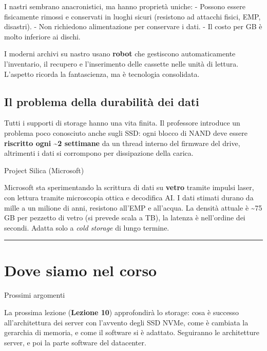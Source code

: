 \documentclass[
  italian,
  openany]{book}
\begin{document}
I nastri sembrano anacronistici, ma hanno proprietà uniche: - Possono
essere fisicamente rimossi e conservati in luoghi sicuri (resistono ad
attacchi fisici, EMP, disastri). - Non richiedono alimentazione per
conservare i dati. - Il costo per GB è molto inferiore ai dischi.

I moderni archivi su nastro usano \textbf{robot} che gestiscono
automaticamente l'inventario, il recupero e l'inserimento delle cassette
nelle unità di lettura. L'aspetto ricorda la fantascienza, ma è
tecnologia consolidata.

\subsection{Il problema della durabilità dei
dati}\label{il-problema-della-durabilituxe0-dei-dati}

Tutti i supporti di storage hanno una vita finita. Il professore
introduce un problema poco conosciuto anche sugli SSD: ogni blocco di
NAND deve essere \textbf{riscritto ogni \textasciitilde2 settimane} da
un thread interno del firmware del drive, altrimenti i dati si
corrompono per dissipazione della carica.

\begin{calloutnote}{Project Silica (Microsoft)}

Microsoft sta sperimentando la scrittura di dati su \textbf{vetro}
tramite impulsi laser, con lettura tramite microscopia ottica e
decodifica AI. I dati stimati durano da mille a un milione di anni,
resistono all'EMP e all'acqua. La densità attuale è \textasciitilde75 GB
per pezzetto di vetro (si prevede scala a TB), la latenza è nell'ordine
dei secondi. Adatta solo a \emph{cold storage} di lungo termine.

\end{calloutnote}

\begin{center}\rule{0.5\linewidth}{0.5pt}\end{center}

\section{Dove siamo nel corso}\label{dove-siamo-nel-corso}

\begin{calloutnote}{Prossimi argomenti}

La prossima lezione (\textbf{Lezione 10}) approfondirà lo storage: cosa
è successo all'architettura dei server con l'avvento degli SSD NVMe,
come è cambiata la gerarchia di memoria, e come il software si è
adattato. Seguiranno le architetture server, e poi la parte software del
datacenter.

\end{calloutnote}
\end{document}
